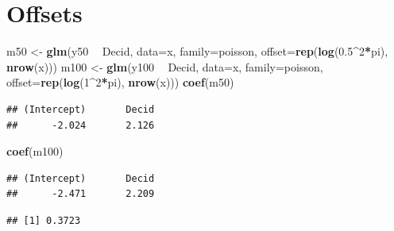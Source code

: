 \documentclass[12pt,]{book}
\newenvironment{Shaded}{\begin{snugshade}}{\end{snugshade}}
\newcommand{\DataTypeTok}[1]{\textcolor[rgb]{0.13,0.29,0.53}{#1}}
\newcommand{\DecValTok}[1]{\textcolor[rgb]{0.00,0.00,0.81}{#1}}
\newcommand{\FloatTok}[1]{\textcolor[rgb]{0.00,0.00,0.81}{#1}}
\newcommand{\KeywordTok}[1]{\textcolor[rgb]{0.13,0.29,0.53}{\textbf{#1}}}
\newcommand{\NormalTok}[1]{#1}
\newcommand{\OperatorTok}[1]{\textcolor[rgb]{0.81,0.36,0.00}{\textbf{#1}}}
\newcommand{\StringTok}[1]{\textcolor[rgb]{0.31,0.60,0.02}{#1}}
\begin{document}
\hypertarget{offsets}{%
\section{Offsets}\label{offsets}}

\begin{Shaded}
\begin{Highlighting}[]
\NormalTok{m50 <-}\StringTok{ }\KeywordTok{glm}\NormalTok{(y50 }\OperatorTok{~}\StringTok{ }\NormalTok{Decid, }\DataTypeTok{data=}\NormalTok{x, }\DataTypeTok{family=}\NormalTok{poisson, }
  \DataTypeTok{offset=}\KeywordTok{rep}\NormalTok{(}\KeywordTok{log}\NormalTok{(}\FloatTok{0.5}\OperatorTok{^}\DecValTok{2}\OperatorTok{*}\NormalTok{pi), }\KeywordTok{nrow}\NormalTok{(x)))}
\NormalTok{m100 <-}\StringTok{ }\KeywordTok{glm}\NormalTok{(y100 }\OperatorTok{~}\StringTok{ }\NormalTok{Decid, }\DataTypeTok{data=}\NormalTok{x, }\DataTypeTok{family=}\NormalTok{poisson,}
  \DataTypeTok{offset=}\KeywordTok{rep}\NormalTok{(}\KeywordTok{log}\NormalTok{(}\DecValTok{1}\OperatorTok{^}\DecValTok{2}\OperatorTok{*}\NormalTok{pi), }\KeywordTok{nrow}\NormalTok{(x)))}
\KeywordTok{coef}\NormalTok{(m50)}
\end{Highlighting}
\end{Shaded}

\begin{verbatim}
## (Intercept)       Decid 
##      -2.024       2.126
\end{verbatim}

\begin{Shaded}
\begin{Highlighting}[]
\KeywordTok{coef}\NormalTok{(m100)}
\end{Highlighting}
\end{Shaded}

\begin{verbatim}
## (Intercept)       Decid 
##      -2.471       2.209
\end{verbatim}

\begin{Shaded}
\end{Shaded}

\begin{verbatim}
## [1] 0.3723
\end{verbatim}
\end{document}
